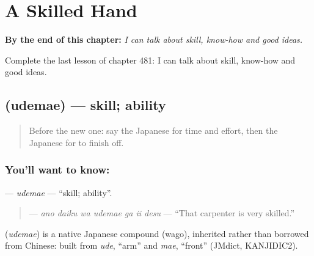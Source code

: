 
\chapter{A Skilled Hand}
\label{ch:ja-a-skilled-hand}

\begin{chapteropening}
\textbf{By the end of this chapter:} \emph{I can talk about skill, know-how and good ideas.}

Complete the last lesson of chapter 481: I can talk about skill, know-how and good ideas.
\end{chapteropening}

\section[\texorpdfstring{\ja{うでまえ} (udemae)}{うでまえ (udemae)}]{ (udemae) — skill; ability}

\label{lesson:JA-C481-udemae}



\begin{quote}
Before the new one: say the Japanese for time and effort, then the Japanese for to finish off.
\end{quote}

\subsection*{You'll want to know: }
\textbf{} — \emph{udemae} — \textquotedblleft{}skill; ability\textquotedblright{}.

\begin{quote}
\textbf{   } — \emph{ano daiku wa udemae ga ii desu} — \textquotedblleft{}That carpenter is very skilled.\textquotedblright{}
\end{quote}

\begin{cousinweb}
\textbf{} (\emph{udemae}) is a native Japanese compound (wago), inherited rather than borrowed from Chinese: built from \emph{ude}, \textquotedblleft{}arm\textquotedblright{} and \emph{mae}, \textquotedblleft{}front\textquotedblright{} (JMdict, KANJIDIC2).
\end{cousinweb}

